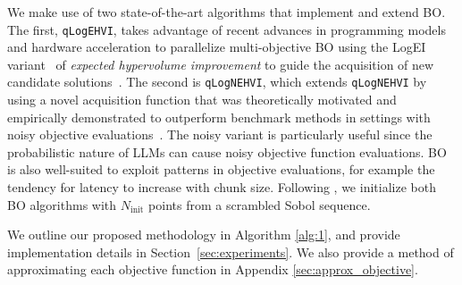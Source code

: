 We make use of two state-of-the-art algorithms that implement and extend BO. The first, \texttt{qLogEHVI}, takes advantage of recent advances in programming models and hardware acceleration to parallelize multi-objective BO using the LogEI variant~\citep{ament2023unexpected} of \emph{expected hypervolume improvement} to guide the acquisition of new candidate solutions~\citep{daulton2020differentiable}. The second is \texttt{qLogNEHVI}, which extends \texttt{qLogNEHVI} by using a novel acquisition function that was theoretically motivated and empirically demonstrated to outperform benchmark methods in settings with noisy objective evaluations~\citep{daulton2021parallel}. The noisy variant is particularly useful since the probabilistic nature of LLMs can cause noisy objective function evaluations.
BO is also well-suited to exploit patterns in objective evaluations, for example the tendency for latency to increase with chunk size. Following \cite{daulton2021parallel}, we initialize both BO algorithms with $N_\text{init}$ points from a scrambled Sobol sequence.

We outline our proposed methodology in Algorithm \ref{alg:1}, and provide implementation details in Section~\ref{sec:experiments}. We also provide a method of approximating each objective function in Appendix \ref{sec:approx_objective}.

